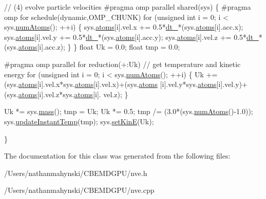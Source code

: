 \begin{DoxyCode}
    \textcolor{comment}{// (4) evolve particle velocities}
\textcolor{preprocessor}{    #pragma omp parallel shared(sys)}
\textcolor{preprocessor}{}    \{
\textcolor{preprocessor}{    #pragma omp for schedule(dynamic,OMP\_CHUNK)}
\textcolor{preprocessor}{}    \textcolor{keywordflow}{for} (\textcolor{keywordtype}{unsigned} \textcolor{keywordtype}{int} i = 0; i < sys.\hyperlink{classsystem_definition_ae8d3c2df2d56241cee03fcc4e2026ae0}{numAtoms}(); ++i) \{
            sys.\hyperlink{classsystem_definition_ae8814d3f60fc1111af2a3f218a4bfcab}{atoms}[i].vel.x += 0.5*\hyperlink{classintegrator_a6e4712b8597e3c40124316d2e9dd5051}{dt\_}*(sys.\hyperlink{classsystem_definition_ae8814d3f60fc1111af2a3f218a4bfcab}{atoms}[i].acc.x);
            sys.\hyperlink{classsystem_definition_ae8814d3f60fc1111af2a3f218a4bfcab}{atoms}[i].vel.y += 0.5*\hyperlink{classintegrator_a6e4712b8597e3c40124316d2e9dd5051}{dt\_}*(sys.\hyperlink{classsystem_definition_ae8814d3f60fc1111af2a3f218a4bfcab}{atoms}[i].acc.y);
            sys.\hyperlink{classsystem_definition_ae8814d3f60fc1111af2a3f218a4bfcab}{atoms}[i].vel.z += 0.5*\hyperlink{classintegrator_a6e4712b8597e3c40124316d2e9dd5051}{dt\_}*(sys.\hyperlink{classsystem_definition_ae8814d3f60fc1111af2a3f218a4bfcab}{atoms}[i].acc.z);
    \}
    \}
    \textcolor{keywordtype}{float} Uk = 0.0;
    \textcolor{keywordtype}{float} tmp = 0.0;

\textcolor{preprocessor}{    #pragma omp parallel for reduction(+:Uk)}
\textcolor{preprocessor}{}    \textcolor{comment}{// get temperature and kinetic energy}
    \textcolor{keywordflow}{for} (\textcolor{keywordtype}{unsigned} \textcolor{keywordtype}{int} i = 0; i < sys.\hyperlink{classsystem_definition_ae8d3c2df2d56241cee03fcc4e2026ae0}{numAtoms}(); ++i) \{
        Uk += (sys.\hyperlink{classsystem_definition_ae8814d3f60fc1111af2a3f218a4bfcab}{atoms}[i].vel.x*sys.\hyperlink{classsystem_definition_ae8814d3f60fc1111af2a3f218a4bfcab}{atoms}[i].vel.x)+(sys.\hyperlink{classsystem_definition_ae8814d3f60fc1111af2a3f218a4bfcab}{atoms}
      [i].vel.y*sys.\hyperlink{classsystem_definition_ae8814d3f60fc1111af2a3f218a4bfcab}{atoms}[i].vel.y)+(sys.\hyperlink{classsystem_definition_ae8814d3f60fc1111af2a3f218a4bfcab}{atoms}[i].vel.z*sys.\hyperlink{classsystem_definition_ae8814d3f60fc1111af2a3f218a4bfcab}{atoms}[i].
      vel.z);
    \}
    
    Uk *= sys.\hyperlink{classsystem_definition_acb6dd3df121e3e5bc0eb41c32bd937bd}{mass}();
    tmp = Uk;
    Uk *= 0.5;
    tmp /= (3.0*(sys.\hyperlink{classsystem_definition_ae8d3c2df2d56241cee03fcc4e2026ae0}{numAtoms}()-1.0));
    sys.\hyperlink{classsystem_definition_a285e6cd1de35ed125eecb20f0f774ab3}{updateInstantTemp}(tmp);
    sys.\hyperlink{classsystem_definition_a2b2c236698886bd1d106be802b987b61}{setKinE}(Uk);

\}
\end{DoxyCode}


The documentation for this class was generated from the following files\-:\begin{DoxyCompactItemize}
\item 
/\-Users/nathanmahynski/\-C\-B\-E\-M\-D\-G\-P\-U/nve.\-h\item 
/\-Users/nathanmahynski/\-C\-B\-E\-M\-D\-G\-P\-U/nve.\-cpp\end{DoxyCompactItemize}
